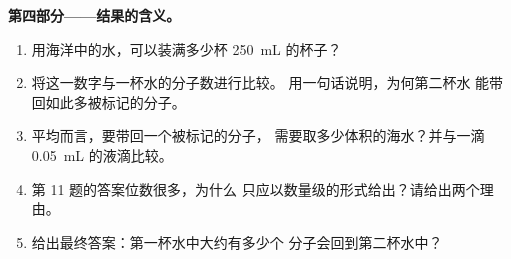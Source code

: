 \begin{problem}
\medskip
\noindent\textbf{第四部分——结果的含义。}
\begin{enumerate}[resume]
  \item 用海洋中的水，可以装满多少杯
        \qty{250}{mL} 的杯子？
  \item 将这一数字与一杯水的分子数进行比较。
        用一句话说明，为何第二杯水
        能带回如此多被标记的分子。
  \item 平均而言，要带回一个被标记的分子，
        需要取多少体积的海水？并与一滴
        \qty{0.05}{mL} 的液滴比较。
  \item 第 11 题的答案位数很多，为什么
        只应以数量级的形式给出？请给出两个理由。
  \item 给出最终答案：第一杯水中大约有多少个
        分子会回到第二杯水中？
\end{enumerate}
\end{problem}
